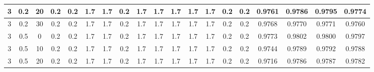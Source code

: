 \documentclass{ieeeaccess}
\begin{document}
\begin{table*}
{\begin{tabular}{|c|c|c|c|c|c|c|c|c|c|c|c|c|c|c|c|c|c|c|}
\hline
3 & 0.2                   & 20     & 0.2                     & 0.2                     & 1.7                     & 1.7                     & 0.2                     & 1.7                     & 1.7                     & 1.7                     & 1.7                     & 1.7                     & 0.2                     & 0.2 & \textcolor[rgb]{0.122,0.122,0.129}{0.9761} & \textcolor[rgb]{0.122,0.122,0.129}{0.9786} & \textcolor[rgb]{0.122,0.122,0.129}{0.9795} & \textcolor[rgb]{0.122,0.122,0.129}{0.9774}  \\ 
\hline
3 & 0.2                   & 30     & 0.2                     & 0.2                     & 1.7                     & 1.7                     & 0.2                     & 1.7                     & 1.7                     & 1.7                     & 1.7                     & 1.7                     & 0.2                     & 0.2 & \textcolor[rgb]{0.122,0.122,0.129}{0.9768} & \textcolor[rgb]{0.122,0.122,0.129}{0.9770} & \textcolor[rgb]{0.122,0.122,0.129}{0.9771} & \textcolor[rgb]{0.122,0.122,0.129}{0.9760}  \\ 
\hline
3 & 0.5                   & 0      & 0.2                     & 0.2                     & 1.7                     & 1.7                     & 0.2                     & 1.7                     & 1.7                     & 1.7                     & 1.7                     & 1.7                     & 0.2                     & 0.2 & \textcolor[rgb]{0.122,0.122,0.129}{0.9773} & \textcolor[rgb]{0.122,0.122,0.129}{0.9802} & \textcolor[rgb]{0.122,0.122,0.129}{0.9800} & \textcolor[rgb]{0.122,0.122,0.129}{0.9797}  \\ 
\hline
3 & 0.5                   & 10     & 0.2                     & 0.2                     & 1.7                     & 1.7                     & 0.2                     & 1.7                     & 1.7                     & 1.7                     & 1.7                     & 1.7                     & 0.2                     & 0.2 & \textcolor[rgb]{0.122,0.122,0.129}{0.9744} & \textcolor[rgb]{0.122,0.122,0.129}{0.9789} & \textcolor[rgb]{0.122,0.122,0.129}{0.9792} & \textcolor[rgb]{0.122,0.122,0.129}{0.9788}  \\ 
\hline
3 & 0.5                   & 20     & 0.2                     & 0.2                     & 1.7                     & 1.7                     & 0.2                     & 1.7                     & 1.7                     & 1.7                     & 1.7                     & 1.7                     & 0.2                     & 0.2 & \textcolor[rgb]{0.122,0.122,0.129}{0.9716} & \textcolor[rgb]{0.122,0.122,0.129}{0.9786} & \textcolor[rgb]{0.122,0.122,0.129}{0.9787} & \textcolor[rgb]{0.122,0.122,0.129}{0.9782}  \\ 

\end{tabular}}
\end{table*}
\end{document}
